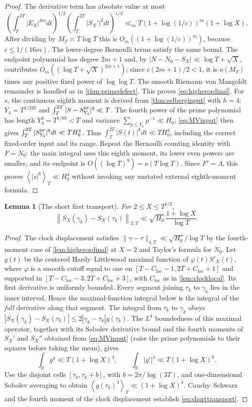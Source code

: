 \documentclass[11pt,reqno]{amsart}
\numberwithin{equation}{section}
\newtheorem{lemma}[theorem]{Lemma}
\newcommand{\av}[1]{\left\langle #1\right\rangle_T}
\newcommand{\Cloc}{C_{\mathrm{loc}}}
\begin{document}
\begin{proof}
The derivative term has absolute value at most
\[
\left(\int_T^{2T}|E_X|^{4m}dt\right)^{1/2}
\left(\int_T^{2T}|S_X'|^2dt\right)^{1/2}
\ll_m T(1+\log(1/c))^m(1+\log X).
\]
After dividing by $M_T\asymp T\log T$ this is
$O_m((1+\log(1/c))^m)$, because $c\le1/(16m)$.
The lower-degree Bernoulli terms satisfy the same bound.
The endpoint polynomial has degree $2m+1$ and, by
$|N-N_0-S_X|\ll\log T+\sqrt X$, contributes
$O_m((\log T+\sqrt X)^{2m+1})$; since
$c(2m+1)/2<1$, it is $o(M_T)$ times any positive fixed
power of $\log\log T$.  The smooth Riemann--von Mangoldt
remainder is handled as in \cref{thm:primedefect}.
This proves \eqref{eq:higherordinal}.
For $s$, the continuous eighth moment is derived from
\cref{thm:selberginput} with $h=4$:
$Y_4=T^{1/320}$ and
$\int_T^{2T}|S-S_{Y_4}^{\rm pr}|^8\ll T$.
The fourth power of the prime polynomial has length
$Y_4^4=T^{1/80}<T$ and variance
$\sum_{p\le Y_4}p^{-1}\ll H_0$;
\eqref{eq:MVinput} then gives
$\int_T^{2T}|S_{Y_4}^{\rm pr}|^8dt\ll T H_0^4$.
Thus $\int_T^{2T}|S(t)|^8dt\ll T H_0^4$,
including the correct fixed-order input and its range.
Repeat the Bernoulli counting identity with $F=N_0$:
the main integral uses this eighth moment,
its lower even powers are smaller, and its endpoint
is $O((\log T)^9)=o(T\log T)$. Since $F'=\Lambda$,
this proves $\av{|s|^8}\ll H_0^4$ without invoking
any unstated external eighth-moment formula.
\end{proof}

\begin{lemma}[The short first transport]\label{lem:shorttransport}
For $2\le X\le T^{1/2}$,
\begin{equation}\label{eq:shorttransport}
\left\|S_X(\gamma_k)-S_X(\tau_k)\right\|_{2,T}
 \ll\sqrt{H_0}\,\frac{1+\log X}{\log T}.
\end{equation}
\end{lemma}
\begin{proof}
The clock displacement satisfies
$\|\gamma-\tau\|_{4,T}\ll\sqrt{H_0}/\log T$
by the fourth-moment case of \cref{lem:higherordinal} at $X=2$
and Taylor's formula for $N_0$.
Let $g(t)$ be the centered Hardy--Littlewood maximal function of
$\varphi(t)S'_X(t)$, where $\varphi$ is a smooth cutoff equal to
one on $[T-\Cloc-1,2T+\Cloc+1]$ and supported in
$[T-\Cloc-3,2T+\Cloc+3]$, with $\Cloc$ as in
\cref{lem:clocklocal}. Its first derivative is uniformly bounded.
Every segment joining $\tau_k$ to $\gamma_k$ lies in the
inner interval. Hence the maximal-function integral below is
the integral of the \emph{full} derivative along that segment.
The integral from $\tau_k$ to $\gamma_k$ obeys
$|S_X(\gamma_k)-S_X(\tau_k)|
\le2|\gamma_k-\tau_k|g(\tau_k)$.
The $L^4$ boundedness of this maximal operator, together with its
Sobolev derivative bound and the fourth moments of $S_X'$ and
$S_X''$ obtained from \eqref{eq:MVinput} (raise the prime
polynomials to their squares before taking the mean), gives
\[
\int_{\mathbb R}g^4\ll T(1+\log X)^4,\qquad
\int_{\mathbb R}|g'|^4\ll T(1+\log X)^8.
\]
Use the disjoint cells $[\tau_k,\tau_k+b]$, with
$b=2\pi/\log(3T)$, and one-dimensional Sobolev averaging to obtain
$\av{g(\tau_k)^4}\ll(1+\log X)^4$.
Cauchy--Schwarz and the fourth moment of the clock displacement
establish \eqref{eq:shorttransport}.
\end{proof}
\end{document}
